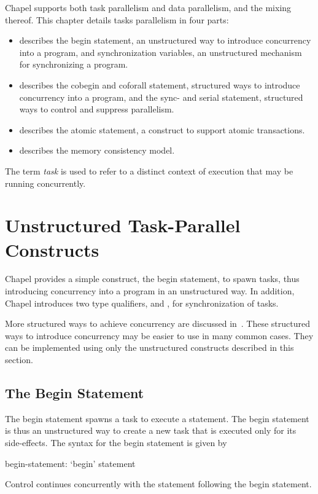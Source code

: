 \label{Task_Parallelism_and_Synchronization}

Chapel supports both task parallelism and data parallelism, and the
mixing thereof.  This chapter details tasks parallelism in four parts:
\begin{itemize}
\item {}
describes the begin statement, an unstructured way to introduce
concurrency into a program, and synchronization variables, an
unstructured mechanism for synchronizing a program.
\item {}
describes the cobegin and coforall statement, structured ways to
introduce concurrency into a program, and the sync- and
serial statement, structured ways to control and suppress parallelism.
\item {}
describes the atomic statement, a construct to support atomic
transactions.
\item {}
describes the memory consistency model.
\end{itemize}

The term \emph{task} is used to refer to a distinct context of
execution that may be running concurrently.

\section{Unstructured Task-Parallel Constructs}
\label{unstructured_task_parallelism}

Chapel provides a simple construct, the begin statement, to spawn
tasks, thus introducing concurrency into a program in an unstructured
way.  In addition, Chapel introduces two type qualifiers, 
and , for synchronization of tasks.

More structured ways to achieve concurrency are discussed
in~.  These structured ways to
introduce concurrency may be easier to use in many common cases.  They
can be implemented using only the unstructured constructs described in
this section.

\subsection{The Begin Statement}
\label{Begin}

The begin statement spawns a task to execute a statement.  The
begin statement is thus an unstructured way to create a new task that
is executed only for its side-effects.  The syntax for the begin
statement is given by
\begin{syntax}
begin-statement:
  `begin' statement
\end{syntax}
Control continues concurrently with the statement following the
begin statement.

